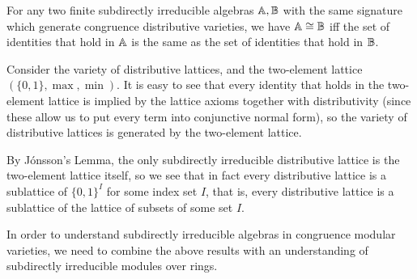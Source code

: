 \documentclass[letterpaper,11pt]{article}
\begin{document}
\begin{cor} For any two finite subdirectly irreducible algebras $\mathbb{A}, \mathbb{B}$ with the same signature which generate congruence distributive varieties, we have $\mathbb{A} \cong \mathbb{B}$ iff the set of identities that hold in $\mathbb{A}$ is the same as the set of identities that hold in $\mathbb{B}$.
\end{cor}

\begin{ex} Consider the variety of distributive lattices, and the two-element lattice $(\{0,1\},\max,\min)$. It is easy to see that every identity that holds in the two-element lattice is implied by the lattice axioms together with distributivity (since these allow us to put every term into conjunctive normal form), so the variety of distributive lattices is generated by the two-element lattice.

By J\'onsson's Lemma, the only subdirectly irreducible distributive lattice is the two-element lattice itself, so we see that in fact every distributive lattice is a sublattice of $\{0,1\}^I$ for some index set $I$, that is, every distributive lattice is a sublattice of the lattice of subsets of some set $I$.
\end{ex}

In order to understand subdirectly irreducible algebras in congruence modular varieties, we need to combine the above results with an understanding of subdirectly irreducible modules over rings.
\end{document}
